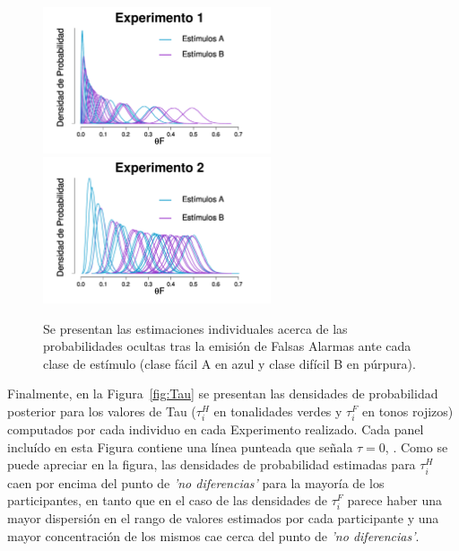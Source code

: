 \begin{figure}[th]
\centering
\includegraphics[width=0.6\textwidth]{Figures/MTau_FA_E1}\\
\includegraphics[width=0.6\textwidth]{Figures/MTau_FA_E2}\\
\caption[Modelo Delta: Inferencias individuales acerca de las probabilidades ocultas tras la emisión de Falsas Alarmas por clase de estímulos; Experimentos 1 y 2]{Se presentan las estimaciones individuales acerca de las probabilidades ocultas tras la emisión de Falsas Alarmas ante cada clase de estímulo (clase fácil A en azul y clase difícil B en púrpura).}
\label{fig:Tau_FA}
\end{figure}

Finalmente, en la Figura~\ref{fig:Tau} se presentan las densidades de probabilidad posterior para los valores de Tau ($\tau^H_{i}$ en tonalidades verdes y $\tau^F_{i}$ en tonos rojizos) computados por cada individuo en cada Experimento realizado. Cada panel incluído en esta Figura contiene una línea punteada que señala $\tau = 0$,  . Como se puede apreciar en la figura, las densidades de probabilidad estimadas para $\tau^H_{i}$ caen por encima del punto de \textit{'no diferencias'} para la mayoría de los participantes, en tanto que en el caso de las densidades de $\tau^F_{i}$ parece haber una mayor dispersión en el rango de valores estimados por cada participante y una mayor concentración de los mismos cae cerca del punto de \textit{'no diferencias'}.\\

